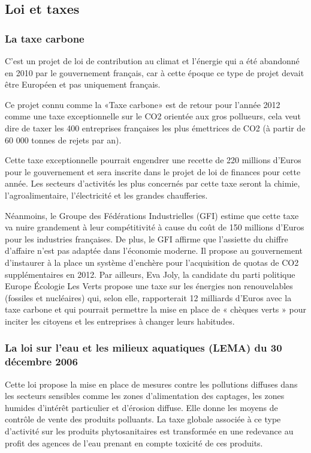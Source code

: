 \documentclass[a4paper,10pt]{article}
\begin{document}
\subsection{Loi et taxes}

\subsubsection{La taxe carbone}

C’est  un projet  de  loi  de contribution  au  climat et  l’énergie  qui a  été
abandonné en  2010 par le  gouvernement français, car  à cette époque ce  type de
projet devait être Européen et pas uniquement français. 


Ce projet  connu comme la «Taxe carbone»  est de retour pour  l’année 2012 comme
une taxe exceptionnelle  sur le CO2 orientée aux gros  pollueurs, cela veut dire
de taxer les 400 entreprises françaises  les plus émettrices de CO2 (à partir de
60 000 tonnes de rejets par an). 


Cette taxe exceptionnelle pourrait engendrer une recette de 220 millions d’Euros
pour le  gouvernement et sera  inscrite dans le  projet de loi de  finances pour
cette année. Les  secteurs d’activités les plus concernés  par cette taxe seront
la chimie, l’agroalimentaire, l’électricité et les grandes chaufferies. 


Néanmoins, le Groupe des Fédérations Industrielles (GFI) estime que cette taxe va nuire grandement à leur compétitivité à cause du coût de 150 millions d’Euros pour les industries françaises. De plus, le GFI affirme que l’assiette du chiffre d’affaire n’est pas adaptée dans l’économie moderne. Il propose au gouvernement d’instaurer à la place un système d’enchère pour l’acquisition de quotas de CO2 supplémentaires en 2012.
Par  ailleurs, Eva Joly,  la candidate  du parti  politique Europe  Écologie Les
Verts  propose  une  taxe  sur  les  énergies  non  renouvelables  (fossiles  et
nucléaires)  qui, selon  elle,  rapporterait  12 milliards  d’Euros  avec la  taxe
carbone et  qui pourrait permettre la  mise en place  de « chèques verts  » pour
inciter les citoyens et les entreprises à changer leurs habitudes.


\subsubsection[La loi sur l’eau et les milieux aquatiques (LEMA)]{La loi sur l’eau et les milieux aquatiques (LEMA) du 30 décembre 2006}

Cette loi propose la mise en place de mesures contre les pollutions diffuses dans les secteurs sensibles comme les zones d’alimentation des captages, les zones humides d’intérêt particulier et d’érosion diffuse.
Elle donne les moyens de contrôle de vente des produits polluants. La taxe globale associée à ce type d’activité sur les produits phytosanitaires est transformée en une redevance au profit des agences de l’eau prenant en compte toxicité de ces produits.
\end{document}
